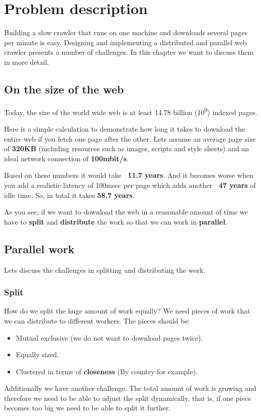 \chapter{Problem description} %
Building a slow crawler that runs on one machine and downloads several pages per minute is easy. Designing and implementing a distributed and parallel web crawler presents a number of challenges. In this chapter we want to discuss them in more detail.

\label{Chapter3} %


\section{On the size of the web}
Today, the size of the world wide web is at least 14.78 billion (10\textsuperscript{9}) indexed pages.\cite{wwwsize}

Here is a simple calculation to demonstrate how long it takes to download the entire web if you fetch one page after the other.
Lets assume an average page size of \textbf{320KB} \cite{webmetrics} (including resources such as images, scripts and style sheets) and an ideal network connection of \textbf{100mbit/s}.

Based on these numbers it would take \textbf{~11.7 years}. And it becomes worse when you add a realistic latency of 100msec per page which adds another \textbf{~47 years} of idle time. So, in total it takes \textbf{58.7 years}.

As you see, if we want to download the web in a reasonable amount of time we have to \textbf{split} and \textbf{distribute} the work so that we can work in \textbf{parallel}.

\section{Parallel work}
Lets discuss the challenges in splitting and distributing the work.
\subsection{Split}
How do we split the huge amount of work equally? We need pieces of work that we can distribute to different workers. The pieces should be:
\begin{itemize}
\item Mutual exclusive (we do not want to download pages twice).
\item Equally sized.
\item Clustered in terms of \textbf{closeness} (By country for example).
\end{itemize}
Additionally we have another challenge. The total amount of work is growing and therefore we need to be able to adjust the split dynamically, that is, if one piece becomes too big we need to be able to split it further.
